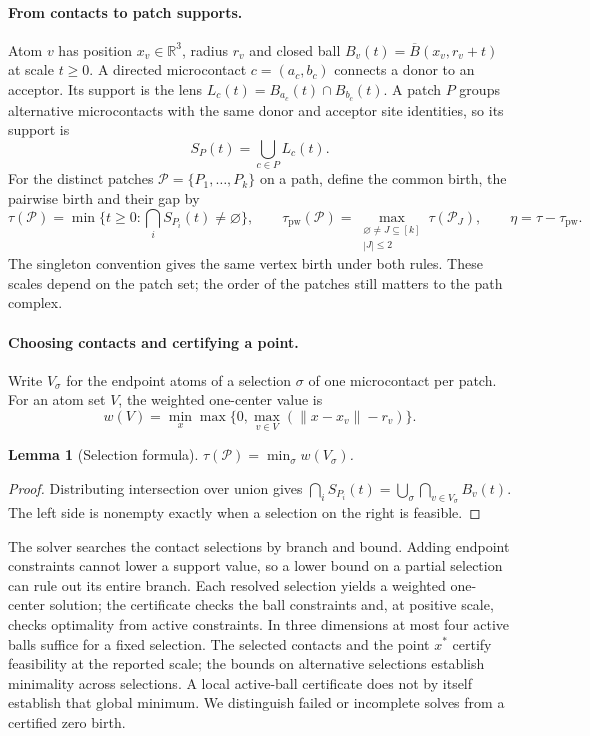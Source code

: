 \documentclass[11pt]{article}
\newcommand{\pw}{\tau_{\mathrm{pw}}}
\newtheorem{lemma}{Lemma}
\begin{document}
\paragraph{From contacts to patch supports.}
Atom $v$ has position $x_v\in\mathbb R^3$, radius $r_v$ and closed ball $B_v(t)=\overline B(x_v,r_v+t)$ at scale $t\geq 0$. A directed microcontact $c=(a_c,b_c)$ connects a donor to an acceptor. Its support is the lens $L_c(t)=B_{a_c}(t)\cap B_{b_c}(t)$. A patch $P$ groups alternative microcontacts with the same donor and acceptor site identities, so its support is
\[
 S_P(t)=\bigcup_{c\in P}L_c(t).
\]
For the distinct patches $\mathcal P=\{P_1,\ldots,P_k\}$ on a path, define the common birth, the pairwise birth and their gap by
\begin{equation}
 \tau(\mathcal P)=\min\{t\geq 0:\bigcap_i S_{P_i}(t)\ne\varnothing\},
 \qquad
 \pw(\mathcal P)=\max_{\substack{\varnothing\ne J\subseteq[k]\\ |J|\leq 2}}\tau(\mathcal P_J),
 \qquad
 \eta=\tau-\pw.
 \label{eq:birth}
\end{equation}
The singleton convention gives the same vertex birth under both rules. These scales depend on the patch set; the order of the patches still matters to the path complex.

\paragraph{Choosing contacts and certifying a point.}
Write $V_\sigma$ for the endpoint atoms of a selection $\sigma$ of one microcontact per patch. For an atom set $V$, the weighted one-center value is
\[
 w(V)=\min_x\max\bigl\{0,\max_{v\in V}(\|x-x_v\|-r_v)\bigr\}.
\]
\begin{lemma}[Selection formula]
\label{lem:selection}
$\tau(\mathcal P)=\min_\sigma w(V_\sigma)$.
\end{lemma}
\begin{proof}
Distributing intersection over union gives $\bigcap_i S_{P_i}(t)=\bigcup_\sigma\bigcap_{v\in V_\sigma} B_v(t)$. The left side is nonempty exactly when a selection on the right is feasible.
\end{proof}

The solver searches the contact selections by branch and bound. Adding endpoint constraints cannot lower a support value, so a lower bound on a partial selection can rule out its entire branch. Each resolved selection yields a weighted one-center solution; the certificate checks the ball constraints and, at positive scale, checks optimality from active constraints. In three dimensions at most four active balls suffice for a fixed selection. The selected contacts and the point $x^*$ certify feasibility at the reported scale; the bounds on alternative selections establish minimality across selections. A local active-ball certificate does not by itself establish that global minimum. We distinguish failed or incomplete solves from a certified zero birth.
\end{document}
